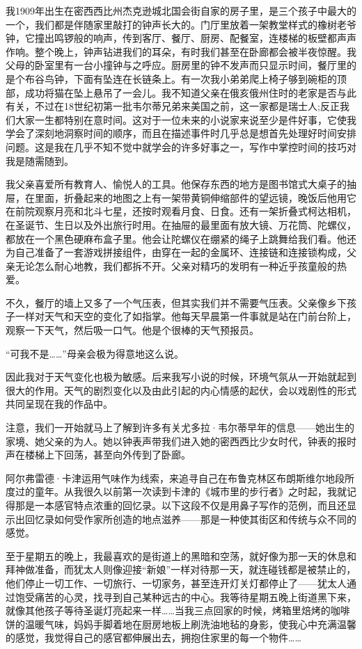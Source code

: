我1909年出生在密西西比州杰克逊城北国会街自家的房子里，是三个孩子中最大的一个，我们都是伴随家里敲打的钟声长大的。门厅里放着一架教堂样式的橡树老爷钟，它撞出鸣锣般的响声，传到客厅、餐厅、厨房、配餐室，连楼梯的板壁都声声作响。整个晚上，钟声钻进我们的耳朵，有时我们甚至在卧廊都会被半夜惊醒。我父母的卧室里有一台小撞钟与之呼应。厨房里的钟不发声而只显示时间，餐厅里的是个布谷鸟钟，下面有坠连在长链条上。有一次我小弟弟爬上椅子够到碗柜的顶部，成功将猫在坠上悬吊了一会儿。我不知道父亲在俄亥俄州住时的老家是否与此有关，不过在18世纪初第一批韦尔蒂兄弟来美国之前，这一家都是瑞士人;反正我们大家一生都特别在意时间。这对于一位未来的小说家来说至少是件好事，它使我学会了深刻地洞察时间的顺序，而且在描述事件时几乎总是想首先处理好时间安排问题。这是我在几乎不知不觉中就学会的许多好事之一，写作中掌控时间的技巧对我是随需随到。

我父亲喜爱所有教育人、愉悦人的工具。他保存东西的地方是图书馆式大桌子的抽屉，在里面，折叠起来的地图之上有一架带黄铜伸缩部件的望远镜，晚饭后他用它在前院观察月亮和北斗七星，还按时观看月食、日食。还有一架折叠式柯达相机，在圣诞节、生日以及外出旅行时用。在抽屉的最里面有放大镜、万花筒、陀螺仪，都放在一个黑色硬麻布盒子里。他会让陀螺仪在绷紧的绳子上跳舞给我们看。他还为自己准备了一套游戏拼接组件，由穿在一起的金属环、连接链和连接锁构成，父亲无论怎么耐心地教，我们都拆不开。父亲对精巧的发明有一种近乎孩童般的热爱。

不久，餐厅的墙上又多了一个气压表，但其实我们并不需要气压表。父亲像乡下孩子一样对天气和天空的变化了如指掌。他每天早晨第一件事就是站在门前台阶上，观察一下天气，然后吸一口气。他是个很棒的天气预报员。

“可我不是……”母亲会极为得意地这么说。

因此我对于天气变化也极为敏感。后来我写小说的时候，环境气氛从一开始就起到很大的作用。天气的剧烈变化以及由此引起的内心情感的起伏，会以戏剧性的形式共同呈现在我的作品中。

注意，我们一开始就马上了解到许多有关尤多拉·韦尔蒂早年的信息——她出生的家境、她父亲的为人。她以钟表声带我们进入她的密西西比少女时代，钟表的报时声在楼梯上下回荡，甚至向外传到了卧廊。

阿尔弗雷德·卡津运用气味作为线索，来追寻自己在布鲁克林区布朗斯维尔地段所度过的童年。从我很久以前第一次读到卡津的《城市里的步行者》之时起，我就记得那是一本感官特点浓重的回忆录。以下这段不仅是用鼻子写作的范例，而且还显示出回忆录如何受作家所创造的地点滋养——那是一种使其街区和传统与众不同的感觉。

至于星期五的晚上，我最喜欢的是街道上的黑暗和空荡，就好像为那一天的休息和拜神做准备，而犹太人则像迎接“新娘”一样对待那一天，就连碰钱都是被禁止的，他们停止一切工作、一切旅行、一切家务，甚至连开灯关灯都停止了——犹太人通过饱受痛苦的心灵，找寻到自己某种远古的中心。我等待星期五晚上街道黑下来，就像其他孩子等待圣诞灯亮起来一样……当我三点回家的时候，烤箱里焙烤的咖啡饼的温暖气味，妈妈手脚着地在厨房地板上刷洗油地毡的身影，使我心中充满温馨的感觉，我觉得自己的感官都伸展出去，拥抱住家里的每一个物件……

